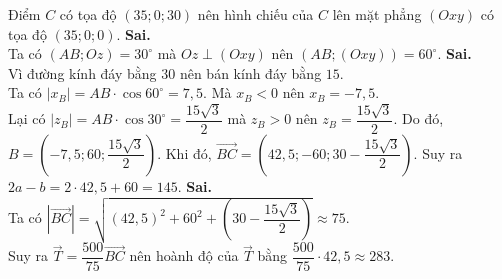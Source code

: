 \begin{ex}
{\begin{itemchoice}
		Điểm $C$ có tọa độ $(35;0;30)$ nên hình chiếu của $C$ lên mặt phẳng $(Oxy)$ có tọa độ $(35;0;0)$.
		\itemch \textbf{Sai.}\\
		Ta có $(AB;Oz)=30^\circ$ mà $Oz\perp (Oxy)$ nên $(AB;(Oxy))=60^\circ$.
		\itemch \textbf{Sai.}\\
		Vì đường kính đáy bằng $30$ nên bán kính đáy bằng $15$.\\
		Ta có $|x_B|=AB\cdot\cos 60^\circ=7{,}5$. Mà $x_B<0$ nên $x_B=-7{,}5$.\\
		Lại có $|z_B|=AB\cdot \cos 30^\circ=\dfrac{15\sqrt{3}}{2}$ mà $z_B>0$ nên $z_B=\dfrac{15\sqrt{3}}{2}$. Do đó, $B=\left(-7{,}5;60;\dfrac{15\sqrt{3}}{2}\right)$.
		Khi đó, $\overrightarrow{BC}=\left(42{,}5;-60;30-\dfrac{15\sqrt{3}}{2}\right)$. Suy ra $2a-b=2\cdot42{,}5+60=145$.
		\itemch \textbf{Sai.}\\
		Ta có $\left|\overrightarrow{BC}\right|=\sqrt{(42{,}5)^2+60^2+\left(30-\dfrac{15\sqrt{3}}{2}\right)}\approx 75$.\\
		Suy ra $\overrightarrow{T}=\dfrac{500}{75}\overrightarrow{BC}$ nên hoành độ của $\overrightarrow{T}$ bằng $\dfrac{500}{75}\cdot 42{,}5\approx 283$.
	\end{itemchoice}}
\end{ex}
